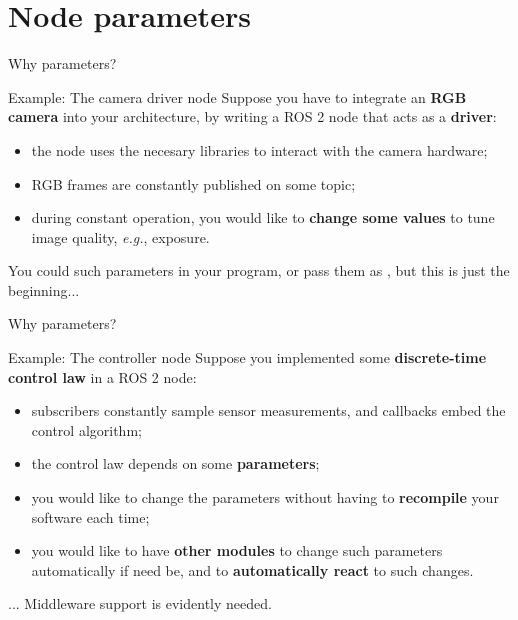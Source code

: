 
\section{Node parameters}

\begin{frame}{Why parameters?}
  \justifying
	\begin{exampleblock}{Example: The camera driver node}
    \justifying
		Suppose you have to integrate an \textbf{RGB camera} into your architecture, by writing a ROS 2 node that acts as a \textbf{driver}:
		\begin{itemize}
			\item the node uses the necesary libraries to interact with the camera hardware;
			\item RGB frames are constantly published on some topic;
			\item during constant operation, you would like to \textbf{change some values} to tune image quality, \emph{e.g.}, exposure.
		\end{itemize}
	\end{exampleblock}
	You could  such parameters in your program, or pass them as , but this is just the beginning...
\end{frame}
\begin{frame}{Why parameters?}
  \justifying
	\begin{exampleblock}{Example: The controller node}
    \justifying
		Suppose you implemented some \textbf{discrete-time control law} in a ROS 2 node:
		\begin{itemize}
			\item subscribers constantly sample sensor measurements, and callbacks embed the control algorithm;
			\item the control law depends on some \textbf{parameters};
			\item you would like to change the parameters without having to \textbf{recompile} your software each time;
			\item you would like to have \textbf{other modules} to change such parameters automatically if need be, and to \textbf{automatically react} to such changes.
		\end{itemize}
	\end{exampleblock}
	... Middleware support is evidently needed.
\end{frame}

